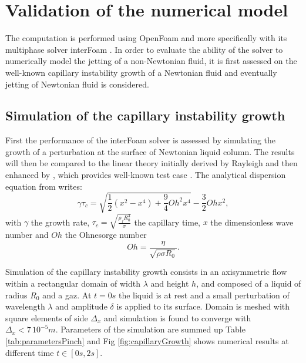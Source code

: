 \documentclass[twocolumn,10pt]{asme2ej}
\begin{document}
\section{Validation of the numerical model}
The computation is performed using OpenFoam and more specifically with its multiphase solver interFoam \cite{deshpande2012evaluating}. In order to evaluate the ability of the solver to numerically model the jetting of a non-Newtonian fluid, it is first assessed on the well-known capillary instability growth of a Newtonian fluid and eventually jetting of Newtonian fluid is considered.

\subsection{Simulation of the capillary instability growth}
First the performance of the interFoam solver is assessed by simulating the growth of a perturbation at the surface of Newtonian liquid column. The results will then be compared to the linear theory initially derived by Rayleigh \cite{rayleigh1892xvi} and then enhanced by \cite{chandrasekhar2013hydrodynamic}, which provides well-known test case \cite{delteil2011numerical,cervone2010simulation}.
The analytical dispersion equation from \cite{chandrasekhar2013hydrodynamic} writes:
\begin{equation}
    \gamma \tau_c = \sqrt{\frac{1}{2}(x^{2}-x^{4}) + \frac{9}{4}Oh^{2}x^{4}}-\frac{3}{2}Oh x^{2},
    \label{eq:growthRateAnalytical}
\end{equation}
with $\gamma$ the growth rate, $\displaystyle \tau_c = \sqrt{\frac{\rho_f R_0^3}{\sigma}}$ the capillary time, $x$ the dimensionless wave number and $Oh$ the Ohnesorge number
\begin{equation}
    Oh=\frac{\eta}{\sqrt{\rho \sigma R_0}}.
    \label{eq:Oh2}
\end{equation} 

Simulation of the capillary instability growth consists in an axisymmetric flow within a rectangular domain of width $\lambda$ and height $h$, and composed of a liquid of radius $R_0$ and a gaz. At $t = 0s$ the liquid is at rest and a small perturbation of wavelength $\lambda$ and amplitude $\delta$ is applied to its surface. 
Domain is meshed with square elements of side $\Delta_x$ and simulation is found to converge with $\Delta_x< 7\,10^{-5}m$. Parameters of the simulation are summed up Table \ref{tab:parametersPinch} and Fig \ref{fig:capillaryGrowth} shows numerical results at different time $t \in [0s,2s]$.
\end{document}
